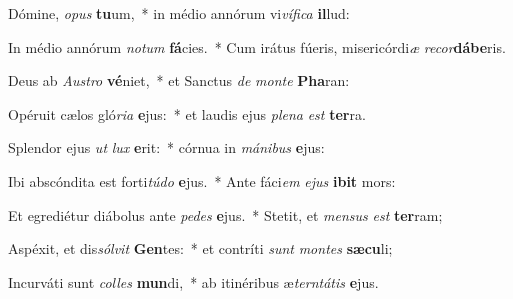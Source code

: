 \item Dómine, \textit{o}\textit{pus} \textbf{tu}um,~* in médio annórum vi\textit{ví}\textit{fi}\textit{ca} \textbf{il}lud:
\item In médio annórum \textit{no}\textit{tum} \textbf{fá}cies.~* Cum irátus fúeris, misericórdi\textit{æ} \textit{re}\textit{cor}\textbf{dá}\textbf{be}ris.
\item Deus ab \textit{Aus}\textit{tro} \textbf{vé}niet,~* et Sanctus \textit{de} \textit{mon}\textit{te} \textbf{Pha}ran:
\item Opéruit cælos gló\textit{ri}\textit{a} \textbf{e}jus:~* et laudis ejus \textit{ple}\textit{na} \textit{est} \textbf{ter}ra.
\item Splendor ejus \textit{ut} \textit{lux} \textbf{e}rit:~* córnua in \textit{má}\textit{ni}\textit{bus} \textbf{e}jus:
\item Ibi abscóndita est forti\textit{tú}\textit{do} \textbf{e}jus.~* Ante fáci\textit{em} \textit{e}\textit{jus} \textbf{i}\textbf{bit} mors:
\item Et egrediétur diábolus ante \textit{pe}\textit{des} \textbf{e}jus.~* Stetit, et \textit{men}\textit{sus} \textit{est} \textbf{ter}ram;
\item Aspéxit, et dis\textit{sól}\textit{vit} \textbf{Gen}tes:~* et contríti \textit{sunt} \textit{mon}\textit{tes} \textbf{sæ}\textbf{cu}li;
\item Incurváti sunt \textit{col}\textit{les} \textbf{mun}di,~* ab itinéribus æ\textit{tern}\textit{tá}\textit{tis} \textbf{e}jus.
